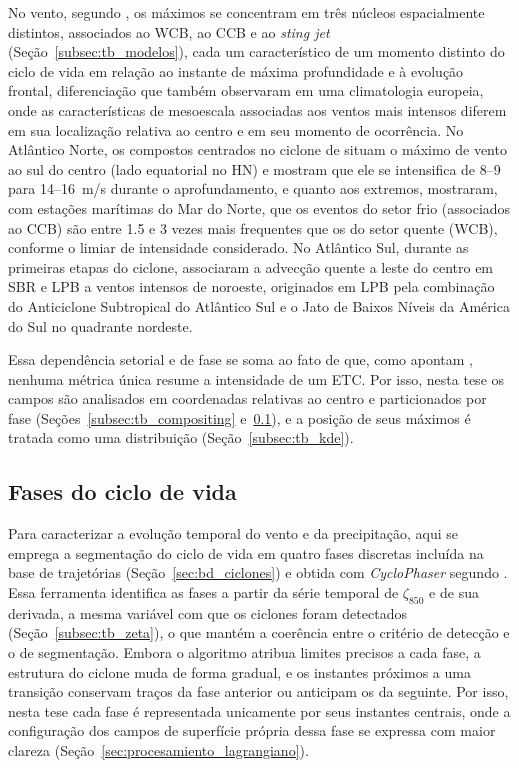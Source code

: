 No vento, segundo \citet{catto2016extratropical}, os máximos se concentram em três núcleos espacialmente distintos, associados ao WCB, ao CCB e ao \textit{sting jet} (Seção~\ref{subsec:tb_modelos}), cada um característico de um momento distinto do ciclo de vida em relação ao instante de máxima profundidade e à evolução frontal, diferenciação que \citet{eisenstein2023identification} também observaram em uma climatologia europeia, onde as características de mesoescala associadas aos ventos mais intensos diferem em sua localização relativa ao centro e em seu momento de ocorrência.
No Atlântico Norte, os compostos centrados no ciclone de \citet{rudeva2011composite} situam o máximo de vento ao sul do centro (lado equatorial no HN) e mostram que ele se intensifica de 8--9 para 14--16~m/s durante o aprofundamento, e quanto aos extremos, \citet{gentile2023observed} mostraram, com estações marítimas do Mar do Norte, que os eventos do setor frio (associados ao CCB) são entre 1.5 e 3 vezes mais frequentes que os do setor quente (WCB), conforme o limiar de intensidade considerado.
No Atlântico Sul, durante as primeiras etapas do ciclone, \citet{gramcianinov2024early} associaram a advecção quente a leste do centro em SBR e LPB a ventos intensos de noroeste, originados em LPB pela combinação do Anticiclone Subtropical do Atlântico Sul e o Jato de Baixos Níveis da América do Sul no quadrante nordeste.

Essa dependência setorial e de fase se soma ao fato de que, como apontam \citet{corner2025classification}, nenhuma métrica única resume a intensidade de um ETC.
Por isso, nesta tese os campos são analisados em coordenadas relativas ao centro e particionados por fase (Seções~\ref{subsec:tb_compositing} e~\ref{subsec:tb_fases}), e a posição de seus máximos é tratada como uma distribuição (Seção~\ref{subsec:tb_kde}).

\subsection{Fases do ciclo de vida}\label{subsec:tb_fases}
Para caracterizar a evolução temporal do vento e da precipitação, aqui se emprega a segmentação do ciclo de vida em quatro fases discretas incluída na base de trajetórias (Seção~\ref{sec:bd_ciclones}) e obtida com \textit{CycloPhaser} \citep{deSouza2025CycloPhaser} segundo \citet{coutodesouza2024new}.
Essa ferramenta identifica as fases a partir da série temporal de $\zeta_{850}$ e de sua derivada, a mesma variável com que os ciclones foram detectados (Seção~\ref{subsec:tb_zeta}), o que mantém a coerência entre o critério de detecção e o de segmentação.
Embora o algoritmo atribua limites precisos a cada fase, a estrutura do ciclone muda de forma gradual, e os instantes próximos a uma transição conservam traços da fase anterior ou anticipam os da seguinte.
Por isso, nesta tese cada fase é representada unicamente por seus instantes centrais, onde a configuração dos campos de superfície própria dessa fase se expressa com maior clareza (Seção~\ref{sec:procesamiento_lagrangiano}).

